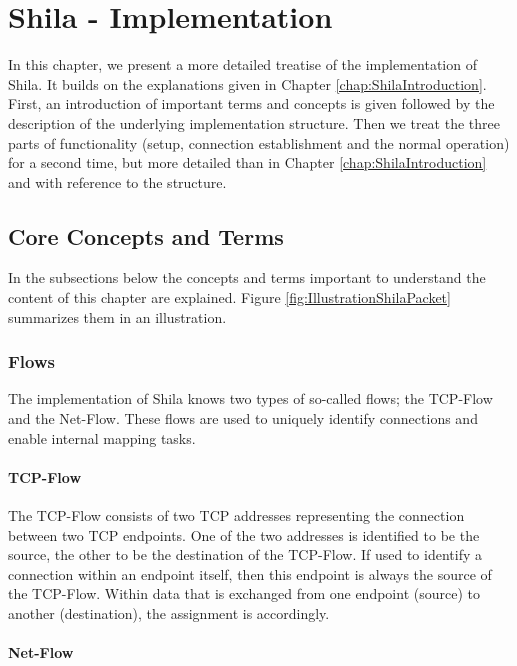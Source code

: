 \chapter{Shila - Implementation}
\label{chap:ShilaImplementation}

In this chapter, we present a more detailed treatise of the implementation of Shila. It builds on the explanations given in Chapter \ref{chap:ShilaIntroduction}. First, an introduction of important terms and concepts is given followed by the description of the underlying implementation structure. Then we treat the three parts of functionality (setup, connection establishment and the normal operation) for a second time, but more detailed than in Chapter \ref{chap:ShilaIntroduction} and with reference to the structure.

\section{Core Concepts and Terms}

In the subsections below the concepts and terms important to understand the content of this chapter are explained. Figure \ref{fig:IllustrationShilaPacket} summarizes them in an illustration.

\subsection*{Flows}
\label{subsec:ShilaImplementationImportantConceptsFlows}

The implementation of Shila knows two types of so-called flows; the TCP-Flow and the Net-Flow.  These flows are used to uniquely identify connections and enable internal mapping tasks.

\subsubsection*{TCP-Flow}

The TCP-Flow consists of two TCP addresses representing the connection between two TCP endpoints. One of the two addresses is identified to be the source, the other to be the destination of the TCP-Flow. If used to identify a connection within an endpoint itself, then this endpoint is always the source of the TCP-Flow. Within data that is exchanged from one endpoint (source) to another (destination), the assignment is accordingly.

\subsubsection*{Net-Flow}


